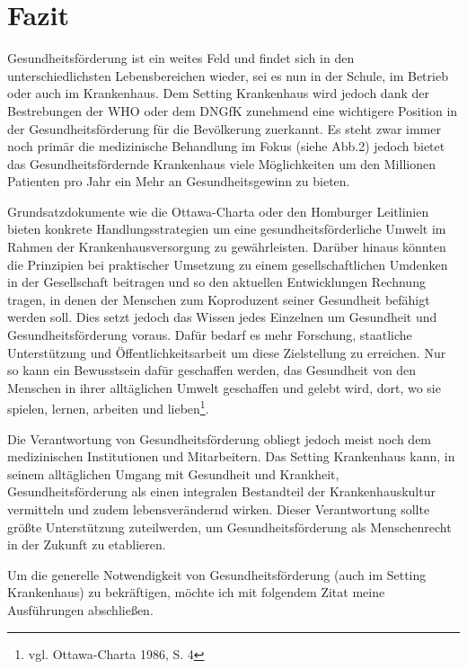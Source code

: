 \section{Fazit}
\label{sec:Fazit}

Gesundheitsförderung ist ein weites Feld und findet sich in den unterschiedlichsten Lebensbereichen wieder, sei es nun in der Schule, im Betrieb oder auch im Krankenhaus. Dem Setting Krankenhaus wird jedoch dank der Bestrebungen der WHO oder dem DNGfK zunehmend eine wichtigere Position in der Gesundheitsförderung für die Bevölkerung zuerkannt. Es steht zwar immer noch primär die medizinische Behandlung im Fokus (siehe Abb.2) jedoch bietet das Gesundheitsfördernde Krankenhaus viele Möglichkeiten um den Millionen Patienten pro Jahr ein Mehr an Gesundheitsgewinn zu bieten. 

Grundsatzdokumente wie die Ottawa-Charta oder den Homburger Leitlinien bieten konkrete Handlungsstrategien um eine gesundheitsförderliche Umwelt im Rahmen der Krankenhausversorgung zu gewährleisten.  Darüber hinaus könnten die Prinzipien bei praktischer Umsetzung zu einem gesellschaftlichen Umdenken in der Gesellschaft beitragen und so den aktuellen Entwicklungen Rechnung tragen, in denen der Menschen zum Koproduzent seiner Gesundheit befähigt werden soll. Dies setzt jedoch das Wissen jedes Einzelnen um Gesundheit und Gesundheitsförderung voraus. Dafür bedarf es mehr Forschung, staatliche Unterstützung und Öffentlichkeitsarbeit um diese Zielstellung zu erreichen. Nur so kann ein Bewusstsein dafür geschaffen werden, das Gesundheit von den Menschen in ihrer alltäglichen Umwelt geschaffen und gelebt wird, dort, wo sie spielen, lernen, arbeiten und lieben\footnote{vgl. Ottawa-Charta 1986, S. 4}. 

Die Verantwortung von Gesundheitsförderung obliegt jedoch meist noch dem medizinischen Institutionen und Mitarbeitern. Das Setting Krankenhaus kann, in seinem alltäglichen Umgang mit Gesundheit und Krankheit, Gesundheitsförderung als einen integralen Bestandteil der Krankenhauskultur vermitteln und zudem lebensverändernd wirken. Dieser Verantwortung sollte größte Unterstützung zuteilwerden, um Gesundheitsförderung als Menschenrecht in der Zukunft zu etablieren. 

Um die generelle Notwendigkeit von Gesundheitsförderung (auch im Setting Krankenhaus) zu bekräftigen, möchte ich mit folgendem Zitat meine Ausführungen abschließen.

